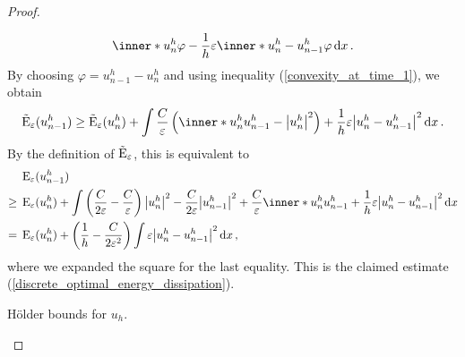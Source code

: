 \begin{proof}
\begin{description}[wide=0pt]
\begin{align*}
			\inner*{u_{ n }^{ h }}{\varphi}
			-
			\frac{ 1 }{ h }
			\varepsilon
			\inner*{ u_{ n }^{ h } - u_{ n - 1 } ^{ h } }{ \varphi }
			\dd{x}.
		\end{align*}
		By choosing $ \varphi = u_{ n - 1 }^{ h } - u_{ n }^{ h } $ 
		and using inequality (\ref{convexity_at_time_1}), we obtain
		\begin{equation*}
			\tilde{\energy}_{ \varepsilon } ( u_{ n - 1 }^{ h } ) 
			\geq
			\tilde{\energy}_{ \varepsilon} ( u_{ n }^{ h } )
			+
			\int
			\frac{ C }{ \varepsilon } 
			\left(
			\inner*{ u_{n }^{ h }}{ u_{ n - 1 }^{ h } }
			-
			\abs{ u_{ n }^{ h }}^{ 2 }
			\right)
			+
			\frac{ 1 }{ h }
			\varepsilon
			\abs{ u_{n }^{ h } - u_{ n -1 }^{ h } }^{ 2 }
			\dd{ x }.
		\end{equation*}
		By the definition of $ \tilde{ \operatorname{E} }_{ \varepsilon }  $, this is 
		equivalent to
		\begin{align*}
			& \energy_{ \varepsilon } (u_{ n - 1 }^{ h } )
			\\
			\geq {} &
			\energy_{ \varepsilon } (u_{ n }^{ h } ) +
			\int
			\left(
			\frac{ C }{ 2 \varepsilon }
			-
			\frac{ C }{ \varepsilon }
			\right)
			\abs{ u_{ n }^{ h } }^{ 2 }
			-
			\frac{ C }{ 2 \varepsilon }
			\abs{ u_{n - 1 }^{ h } }^{ 2 }
			+ 
			\frac{ C }{ \varepsilon }
			\inner*{ u_{ n }^{ h } }{ u_{ n - 1 }^{ h } }
			+ 
			\frac{ 1 }{ h }
			\varepsilon
			\abs{ u_{ n }^{ h } - u_{ n - 1 }^{ h } }^{ 2 }
			\dd{ x }
			\\
			= {} &
			\energy_{ \varepsilon } ( u_{n }^{ h } )
			+
			\left( 
			\frac{ 1 }{ h }
			- 
			\frac{ C }{ 2 \varepsilon^{ 2 } }
			\right)
			\int 
			\varepsilon \abs{ u_{n }^{ h } - u_{ n - 1 }^{ h } }^{ 2 }
			\dd{ x },
		\end{align*}
		where we expanded the square for the last equality.
		This is the claimed estimate 
		(\ref{discrete_optimal_energy_dissipation}).
		
		\item[Step 4:] Hölder bounds for $ u_{ h } $.
		

\end{description}
\end{proof}

